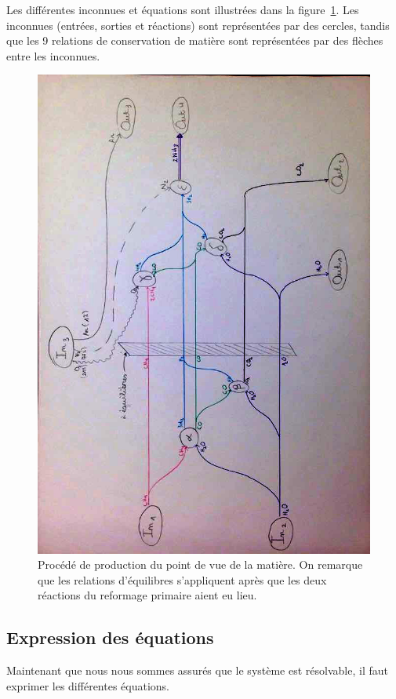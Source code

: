 \documentclass[a4paper,12pt]{article}
\begin{document}
Les différentes inconnues et équations sont illustrées dans
la figure~\ref{fig:flows-matter}.
Les inconnues (entrées, sorties et réactions) sont représentées par des cercles,
tandis que les 9 relations de conservation de matière
sont représentées par des flèches entre les inconnues.

\begin{figure}
    \centering
    \includegraphics[width=.9\textwidth]{flows_matter}
    \caption{
        Procédé de production du point de vue de la matière.
        On remarque que les relations d'équilibres s'appliquent après que les deux
        réactions du reformage primaire aient eu lieu.
    }
    \label{fig:flows-matter}
\end{figure}

\subsection{Expression des équations}

Maintenant que nous nous sommes assurés que le système est résolvable,
il faut exprimer les différentes équations.
\end{document}
